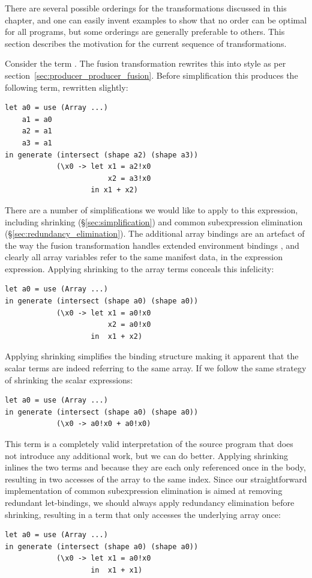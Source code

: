 
There are several possible orderings for the transformations discussed in this
chapter, and one can easily invent examples to show that no order can be optimal
for all programs, but some orderings are generally preferable to others. This
section describes the motivation for the current sequence of transformations.

Consider the term . The fusion transformation rewrites
this into  style as per
section~\ref{sec:producer_producer_fusion}. Before simplification this produces
the following term, rewritten slightly: 
%
\begin{lstlisting}[style=haskell]
let a0 = use (Array ...)
    a1 = a0
    a2 = a1
    a3 = a1
in generate (intersect (shape a2) (shape a3))
            (\x0 -> let x1 = a2!x0
                        x2 = a3!x0
                    in x1 + x2)
\end{lstlisting}
%
There are a number of simplifications we would like to apply to this expression,
including shrinking (\S\ref{sec:simplification}) and common subexpression
elimination (\S\ref{sec:redundancy_elimination}). The additional array bindings
are an artefact of the way the fusion transformation handles extended
environment bindings ,
and clearly all array variables refer to the same manifest data,  in
the expression expression. Applying shrinking to the array terms conceals this
infelicity:
%
\begin{lstlisting}[style=haskell]
let a0 = use (Array ...)
in generate (intersect (shape a0) (shape a0))
            (\x0 -> let x1 = a0!x0
                        x2 = a0!x0
                    in  x1 + x2)
\end{lstlisting}
%
Applying shrinking simplifies the binding structure making it apparent that the
scalar terms are indeed referring to the same array. If we follow the same
strategy of shrinking the scalar expressions:
%
\begin{lstlisting}[style=haskell]
let a0 = use (Array ...)
in generate (intersect (shape a0) (shape a0))
            (\x0 -> a0!x0 + a0!x0)
\end{lstlisting}
%
This term is a completely valid interpretation of the source program that does
not introduce any additional work, but we can do better. Applying shrinking
inlines the two terms  and  because they are each only
referenced once in the body, resulting in two accesses of the array to the same
index. Since our straightforward implementation of common subexpression
elimination is aimed at removing redundant let-bindings, we should always apply
redundancy elimination before shrinking, resulting in a term that only accesses
the underlying array once:
%
\begin{lstlisting}[style=haskell]
let a0 = use (Array ...)
in generate (intersect (shape a0) (shape a0))
            (\x0 -> let x1 = a0!x0
                    in  x1 + x1)
\end{lstlisting}


